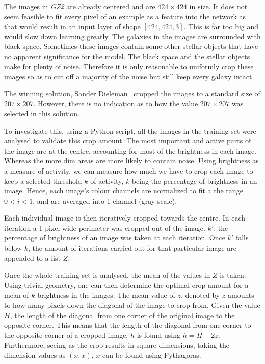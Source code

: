 \documentclass[12pt,a4paper,oneside,oldfontcommands]{memoir}
\begin{document}
The images in \textit{GZ2} are already centered and are \(424\times424\) in size. It does not seem feasible to fit every pixel of an example as a feature into the network as that would result in an input layer of shape \([424, 424, 3]\). This is far too big and would slow down learning greatly. The galaxies in the images are surrounded with black space. Sometimes these images contain some other stellar objects that have no apparent significance for the model. The black space and the stellar objects make for plenty of noise. Therefore it is only reasonable to uniformly crop these images so as to cut off a majority of the noise but still keep every galaxy intact. 

The winning solution, Sander Dieleman~\cite{Sanders-GZ} cropped the images to a standard size of \(207\times207\). However, there is no indication as to how the value \(207\times207\) was selected in this solution. 

To investigate this, using a Python script, all the images in the training set were analysed to validate this crop amount. The most important and active parts of the image are at the centre, accounting for most of the brightness in each image. Whereas the more dim areas are more likely to contain noise. Using brightness as a measure of activity, we can measure how much we have to crop each image to keep a selected threshold \(k\) of activity, \(k\) being the percentage of brightness in an image. Hence, each image’s colour channels are normalized to fit a the range \(0 < i < 1\), and are averaged into 1 channel (gray-scale).

Each individual image is then iteratively cropped towards the centre. In each iteration a 1 pixel wide perimeter was cropped out of the image. \(k'\), the percentage of brightness of an image was taken at each iteration. Once \(k'\) falls below \(k\), the amount of iterations carried out for that particular image are appended to a list \(Z\).

Once the whole training set is analysed, the mean of the values in \(Z\) is taken. Using trivial geometry, one can then determine the optimal crop amount for a mean of \(k\) brightness in the images. The mean value of \(z\), denoted by \(z\) amounts to how many pixels down the diagonal of the image to crop from. Given the value \(H\), the length of the diagonal from one corner of the original image to the opposite corner. This means that the length of the diagonal from one corner to the opposite corner of a cropped image, \(h\) is found using \(h = H - 2z\). Furthermore, seeing as the crop results in square dimensions, taking the dimension values as \((x, x)\), \(x\) can be found using Pythagoras. 
\end{document}
